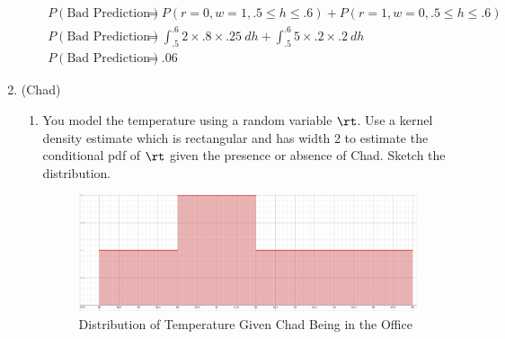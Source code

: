 \documentclass[12pt,twoside]{article}
\begin{document}
\begin{enumerate}
\begin{enumerate}
\begin{equation}
    \begin{split}
        P(\text{Bad Prediction}) &= P(r=0, w=1, .5\leq h \leq .6) + P(r=1,w=0,.5\leq h \leq .6) \\ 
        P(\text{Bad Prediction}) &= \int_{.5}^{.6} 2 \times .8 \times .25 \ dh + \int_{.5}^{.6} 5\times .2 \times .2 \ dh \\
        P(\text{Bad Prediction}) &= .06
    \end{split}
\end{equation}
\end{enumerate}

\item (Chad)
\begin{enumerate}
\item You model the temperature using a random variable $\rt$. Use a kernel density estimate which is rectangular and has width 2 to estimate the conditional pdf of $\rt$ given the presence or absence of Chad. Sketch the distribution.
\subitem

\begin{figure}[h!]
    \centering
    \includegraphics[scale=.35]{3a1.png}
    \caption{Distribution of Temperature Given Chad Being in the Office}
    \label{fig:my_label}
\end{figure}


\end{enumerate}
\end{enumerate}
\end{document}
